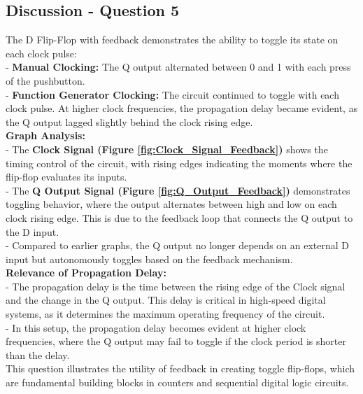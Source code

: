 \documentclass{article}
\begin{document}
    \subsection*{\textbf{Discussion - Question 5}}
    The D Flip-Flop with feedback demonstrates the ability to toggle its state on each clock pulse: \\ 
       - \textbf{Manual Clocking:} The Q output alternated between 0 and 1 with each press of the pushbutton. \\
       - \textbf{Function Generator Clocking:} The circuit continued to toggle with each clock pulse. At higher clock frequencies, the propagation delay became evident, as the Q output lagged slightly behind the clock rising edge. \\
    
    \textbf{Graph Analysis:} \\
       - The \textbf{Clock Signal (Figure \ref{fig:Clock_Signal_Feedback})} shows the timing control of the circuit, with rising edges indicating the moments where the flip-flop evaluates its inputs. \\
       - The \textbf{Q Output Signal (Figure \ref{fig:Q_Output_Feedback})} demonstrates toggling behavior, where the output alternates between high and low on each clock rising edge. This is due to the feedback loop that connects the Q output to the D input. \\ 
       - Compared to earlier graphs, the Q output no longer depends on an external D input but autonomously toggles based on the feedback mechanism. \\
    
    \textbf{Relevance of Propagation Delay:} \\
       - The propagation delay is the time between the rising edge of the Clock signal and the change in the Q output. This delay is critical in high-speed digital systems, as it determines the maximum operating frequency of the circuit. \\
       - In this setup, the propagation delay becomes evident at higher clock frequencies, where the Q output may fail to toggle if the clock period is shorter than the delay. \\
    
    This question illustrates the utility of feedback in creating toggle flip-flops, which are fundamental building blocks in counters and sequential digital logic circuits.
    
    

    
  
\end{document}
